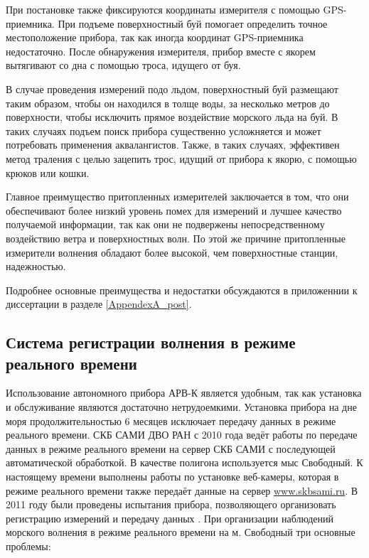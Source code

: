 При постановке также фиксируются координаты измерителя с помощью GPS-приемника. При подъеме поверхностный буй помогает определить точное местоположение прибора, так как иногда координат GPS-приемника недостаточно. После обнаружения измерителя, прибор вместе с якорем вытягивают со дна с помощью троса, идущего от буя.

В случае проведения измерений подо льдом, поверхностный буй размещают таким образом, чтобы он находился в толще воды, за несколько метров до поверхности, чтобы исключить прямое воздействие морского льда на буй. В таких случаях подъем поиск прибора существенно усложняется и может потребовать применения аквалангистов. Также, в таких случаях, эффективен метод траления с целью зацепить трос, идущий от прибора к якорю, с помощью крюков или кошки.

Главное преимущество притопленных измерителей заключается в том, что они обеспечивают более низкий уровень помех для измерений и лучшее качество получаемой информации, так как они не подвержены непосредственному воздействию ветра и поверхностных волн. По этой же причине притопленные измерители волнения обладают более высокой, чем поверхностные станции, надежностью.

Подробнее основные преимущества и недостатки обсуждаются в приложеннии к диссертации в разделе \ref{AppendexA_post}.


\subsection{Система регистрации волнения в режиме реального времени}

Использование автономного прибора АРВ-К является удобным, так как установка и обслуживание являются достаточно нетрудоемкими. Установка прибора на дне моря продолжительностью 6 месяцев исключает передачу данных в режиме реального времени. СКБ САМИ ДВО РАН с 2010 года ведёт работы по передаче данных в режиме реального времени на сервер СКБ САМИ с последующей автоматической обработкой. В качестве полигона используется мыс Свободный. К настоящему времени выполнены работы по установке веб-камеры, которая в режиме реального времени также передаёт данные на сервер \url{www.skbsami.ru}. В 2011 году были проведены испытания прибора, позволяющего организовать регистрацию измерений и передачу данных \cite{Zaits_Kuz_NGTU_2013}. При организации наблюдений морского волнения в режиме реального времени на м. Свободный три основные проблемы:

